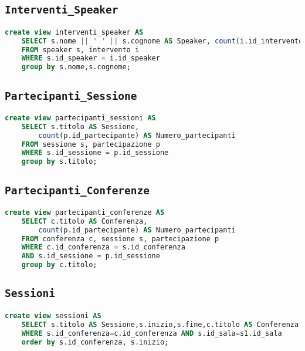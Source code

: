 \subsection{\texttt{Interventi\_Speaker}}
\begin{lstlisting}[language=SQL,style=mystyle]
	create view interventi_speaker AS
	SELECT s.nome || ' ' || s.cognome AS Speaker, count(i.id_intervento)
	FROM speaker s, intervento i 
	WHERE s.id_speaker = i.id_speaker
	group by s.nome,s.cognome;
\end{lstlisting}
\subsection{\texttt{Partecipanti\_Sessione}}
\begin{lstlisting}[language=SQL,style=mystyle]
	create view partecipanti_sessioni AS
	SELECT s.titolo AS Sessione, 
		count(p.id_partecipante) AS Numero_partecipanti
	FROM sessione s, partecipazione p 
	WHERE s.id_sessione = p.id_sessione
	group by s.titolo;
\end{lstlisting}
\subsection{\texttt{Partecipanti\_Conferenze}}
\begin{lstlisting}[language=SQL,style=mystyle]
	create view partecipanti_conferenze AS
	SELECT c.titolo AS Conferenza, 
		count(p.id_partecipante) AS Numero_partecipanti
	FROM conferenza c, sessione s, partecipazione p
	WHERE c.id_conferenza = s.id_conferenza 
	AND s.id_sessione = p.id_sessione
	group by c.titolo;
\end{lstlisting}
\subsection{\texttt{Sessioni}}
\begin{lstlisting}[language=SQL,style=mystyle]
	create view sessioni AS
	SELECT s.titolo AS Sessione,s.inizio,s.fine,c.titolo AS Conferenza,s1.nome FROM sessione s, conferenza c,sala s1
	WHERE s.id_conferenza=c.id_conferenza AND s.id_sala=s1.id_sala
	order by s.id_conferenza, s.inizio;
\end{lstlisting}